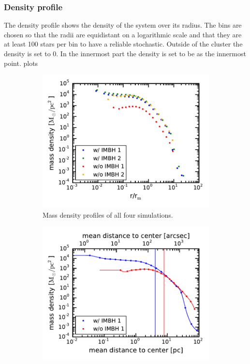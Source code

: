 \subsubsection{Density profile}
The density profile shows the density of the system over its radius. The bins are chosen so that the radii are equidistant on a logarithmic scale and that they are at least 100 stars per bin to have a reliable stochastic. Outside of the cluster the density is set to 0. In the innermost part the density is set to be as the innermost point.
plots\\
\begin{figure}
	\centering
	\begin{subfigure}{0.475\textwidth}
		\centering
		\includegraphics[width=\textwidth]{Plots/density_profiles.pdf}
		\caption{Mass density profiles of all four simulations.}
		\label{mass_dens_points}
	\end{subfigure}
	\hfill
	\begin{subfigure}{0.475\textwidth}
		\centering
		\includegraphics[width=\textwidth]{Plots/density_profiles_interpolated.pdf}

\end{subfigure}
\end{figure}
